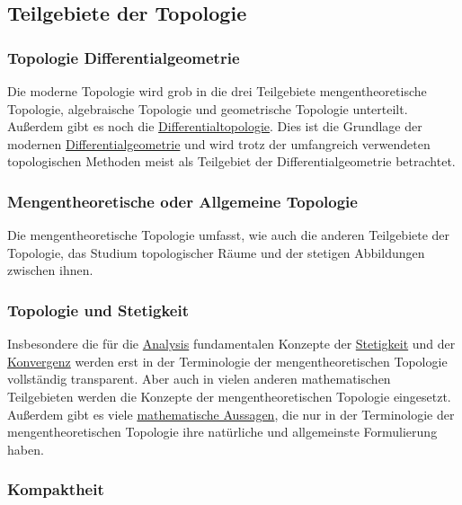 \documentclass[12pt,]{article}
\begin{document}
\subsection{Teilgebiete der Topologie}\label{teilgebiete-der-topologie}

\subsubsection{Topologie
Differentialgeometrie}\label{topologie-differentialgeometrie}

Die moderne Topologie wird grob in die drei Teilgebiete
mengentheoretische Topologie, algebraische Topologie und geometrische
Topologie unterteilt. Außerdem gibt es noch die
\url{Differentialtopologie}. Dies ist die Grundlage der modernen
\url{Differentialgeometrie} und wird trotz der umfangreich verwendeten
topologischen Methoden meist als Teilgebiet der Differentialgeometrie
betrachtet.

\subsubsection{Mengentheoretische oder Allgemeine
Topologie}\label{mengentheoretische-oder-allgemeine-topologie}

Die mengentheoretische Topologie umfasst, wie auch die anderen
Teilgebiete der Topologie, das Studium topologischer Räume und der
stetigen Abbildungen zwischen ihnen.

\subsubsection{Topologie und Stetigkeit}\label{topologie-und-stetigkeit}

Insbesondere die für die \url{Analysis} fundamentalen Konzepte der
\href{Stetigkeit_(Topologie)}{Stetigkeit} und der
\href{Grenzwert_(Folge)}{Konvergenz} werden erst in der Terminologie der
mengentheoretischen Topologie vollständig transparent. Aber auch in
vielen anderen mathematischen Teilgebieten werden die Konzepte der
mengentheoretischen Topologie eingesetzt. Außerdem gibt es viele
\href{Satz_(Mathematik)}{mathematische Aussagen}, die nur in der
Terminologie der mengentheoretischen Topologie ihre natürliche und
allgemeinste Formulierung haben.

\subsubsection{Kompaktheit}\label{kompaktheit}
\end{document}
